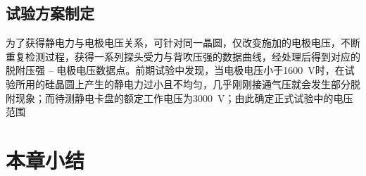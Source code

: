 \subsection{试验方案制定}\label{sec:exp-main-plan}

为了获得静电力与电极电压关系，可针对同一晶圆，仅改变施加的电极电压，不断重复检测过程，获得一系列探头受力与背吹压强的数据曲线，经处理后得到对应的脱附压强\footnotemark{} -- 电极电压数据点。前期试验中发现，当电极电压小于\SI{1600}{\V}时，在试验所用的硅晶圆上产生的静电力过小且不均匀，几乎刚刚接通气压就会发生部分脱附现象；而待测静电卡盘的额定工作电压为\SI{3000}{\V}；由此确定正式试验中的电压范围



\section{本章小结}\label{sec:exp-summary}



